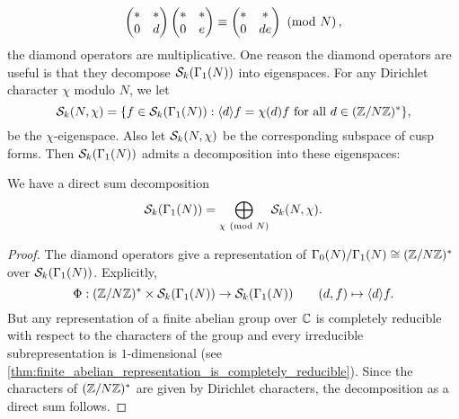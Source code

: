     \[
      \begin{pmatrix} \ast & \ast \\ 0 & d \end{pmatrix}\begin{pmatrix} \ast & \ast \\ 0 & e \end{pmatrix} \equiv \begin{pmatrix} \ast & \ast \\ 0 & de \end{pmatrix} \ \left(\text{mod }N\right),
    \]
    the diamond operators are multiplicative. One reason the diamond operators are useful is that they decompose $\mathcal{S}_{k}(\Gamma_{1}(N))$ into eigenspaces. For any Dirichlet character $\chi$ modulo $N$, we let
    \[
      \mathcal{S}_{k}(N,\chi) = \{f \in \mathcal{S}_{k}(\Gamma_{1}(N)):\text{$\langle d\rangle f = \chi(d)f$ for all $d \in (\mathbb{Z}/N\mathbb{Z})^{\ast}$}\},
    \]
    be the $\chi$-eigenspace. Also let $\mathcal{S}_{k}(N,\chi)$ be the corresponding subspace of cusp forms. Then $\mathcal{S}_{k}(\Gamma_{1}(N))$ admits a decomposition into these eigenspaces:

    \begin{proposition}\label{thm:diamond_operator_decomposition_holomorphic}
      We have a direct sum decomposition
      \[
        \mathcal{S}_{k}(\Gamma_{1}(N)) = \bigoplus_{\chi \ \left(\text{mod }N\right)}\mathcal{S}_{k}(N,\chi).
      \]
    \end{proposition}
    \begin{proof}
      The diamond operators give a representation of $\Gamma_{0}(N)/\Gamma_{1}(N) \cong (\mathbb{Z}/N\mathbb{Z})^{\ast}$ over $\mathcal{S}_{k}(\Gamma_{1}(N))$. Explicitly,
      \[
        \Phi:(\mathbb{Z}/N\mathbb{Z})^{\ast} \times \mathcal{S}_{k}(\Gamma_{1}(N)) \to \mathcal{S}_{k}(\Gamma_{1}(N)) \qquad (d,f) \mapsto \langle d\rangle f.
      \]
      But any representation of a finite abelian group over $\mathbb{C}$ is completely reducible with respect to the characters of the group and every irreducible subrepresentation is $1$-dimensional (see \cref{thm:finite_abelian_representation_is_completely_reducible}). Since the characters of $(\mathbb{Z}/N\mathbb{Z})^{\ast}$ are given by Dirichlet characters, the decomposition as a direct sum follows.
    \end{proof}
    
